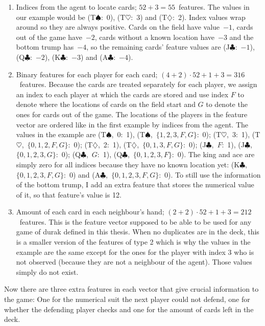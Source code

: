 \documentclass[a4paper,titlepage]{article}
\begin{document}
\begin{enumerate} %
  \item Indices from the agent to locate cards; $52 + 3 = 55$~features. The values in our example would be (T$\spadesuit$:~0), (T$\heartsuit$:~3) and (T$\diamondsuit$:~2). Index values wrap around so they are always positive. Cards on the field have value~$-1$, cards out of the game have~$-2$, cards without a known location have~$-3$ and the bottom trump has~$-4$, so the remaining cards' feature values are (J$\clubsuit$:~$-1$), (Q$\clubsuit$:~$-2$), (K$\clubsuit$:~$-3$) and (A$\clubsuit$:~$-4$).
  \item Binary features for each player for each card; $(4 + 2) \cdot 52  + 1 + 3 = 316$~features. Because the cards are treated separately for each player, we assign an index to each player at which the cards are stored and use index $F$ to denote where the locations of cards on the field start and $G$ to denote the ones for cards out of the game. The locations of the players in the feature vector are ordered like in the first example by indices from the agent. The values in the example are (T$\spadesuit$,~0:~1), (T$\spadesuit$,~$\{1, 2, 3, F, G\}$:~0); (T$\heartsuit$,~3:~1), (T$\heartsuit$,~$\{0, 1, 2, F, G\}$:~0); (T$\diamondsuit$,~2:~1), (T$\diamondsuit$,~$\{0, 1, 3, F, G\}$:~0); (J$\clubsuit$,~$F$:~1), (J$\clubsuit$,~$\{0, 1, 2, 3, G\}$:~0); (Q$\clubsuit$,~$G$:~1), (Q$\clubsuit$,~$\{0, 1, 2, 3, F\}$:~0).
  The king and ace are simply zero for all indices because they have no known location yet: (K$\clubsuit$,~$\{0, 1, 2, 3, F, G\}$:~0) and (A$\clubsuit$,~$\{0, 1, 2, 3, F, G\}$:~0). To still use the information of the bottom trump, I add an extra feature that stores the numerical value of it, so that feature's value is 12.
  \item Amount of each card in each neighbour's hand; $(2 + 2) \cdot 52 + 1 + 3 = 212$~features. This is the feature vector supposed to be able to be used for any game of durak defined in this thesis. When no duplicates are in the deck, this is a smaller version of the features of type 2 which is why the values in the example are the same except for the ones for the player with index 3 who is not observed (because they are not a neighbour of the agent). Those values simply do not exist.
\end{enumerate}
Now there are three extra features in each vector that give crucial information to the game: One for the numerical suit the next player could not defend, one for whether the defending player checks and one for the amount of cards left in the deck.
\end{document}
